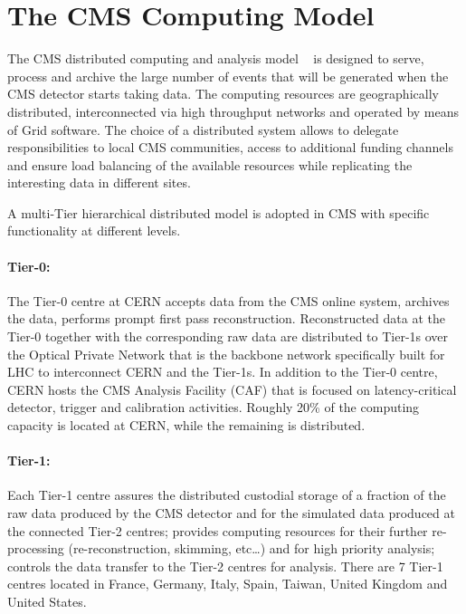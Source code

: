 \section{The CMS Computing Model}
\label{sec:2}
The CMS distributed computing and analysis model ~\cite{RefCM} is designed to serve, process and archive the %
large number of events that will be generated when the CMS detector starts taking data. The computing resources are geographically distributed, interconnected via high throughput networks and operated by means of Grid software. 
The choice of a distributed system allows to delegate responsibilities to local CMS communities, access to additional funding channels and ensure load balancing of the available resources while replicating the interesting data in different sites.


A multi-Tier hierarchical distributed model is adopted in CMS with specific functionality at different levels.
\paragraph{Tier-0:}
The Tier-0 centre at CERN accepts data from the CMS online system, archives the data, performs prompt first pass reconstruction. Reconstructed data at the Tier-0 together with the corresponding raw data are distributed to Tier-1s over the Optical Private Network that is the backbone network specifically built for LHC to interconnect CERN and the Tier-1s.
In addition to the Tier-0 centre, CERN hosts the CMS Analysis Facility (CAF) that is focused on latency-critical detector, trigger and calibration activities.
Roughly 20\% of the computing capacity is located at CERN, while the remaining is distributed.

\paragraph{Tier-1:} 
Each Tier-1 centre assures the distributed custodial storage of a fraction of the raw data produced by the CMS detector and for the simulated data produced at the connected Tier-2 centres; provides computing resources for their further re-processing (re-reconstruction, skimming, etc…) and for high priority analysis; controls the data transfer to the Tier-2 centres for analysis. There are 7 Tier-1 centres located in France, Germany, Italy, Spain, Taiwan, United Kingdom and United States.

